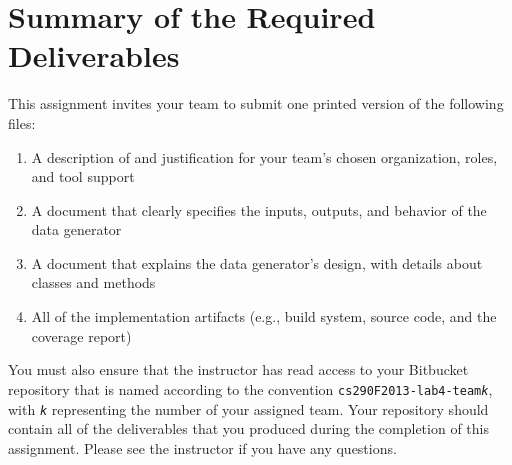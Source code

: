 \section*{Summary of the Required Deliverables}

This assignment invites your team to submit one printed version of the following files:

\begin{enumerate}
	
	\item A description of and justification for your team's chosen organization, roles, and tool support
	\item A document that clearly specifies the inputs, outputs, and behavior of the data generator
	\item A document that explains the data generator's design, with details about classes and methods
	\item All of the implementation artifacts (e.g., build system, source code, and the coverage report) 

\end{enumerate}

You must also ensure that the instructor has read access to your Bitbucket repository that is named according to the
convention {\tt cs290F2013-lab4-team{\em k}}, with {\tt {\em k}} representing the number of your assigned team.  Your
repository should contain all of the deliverables that you produced during the completion of this assignment.  Please
see the instructor if you have any questions.


